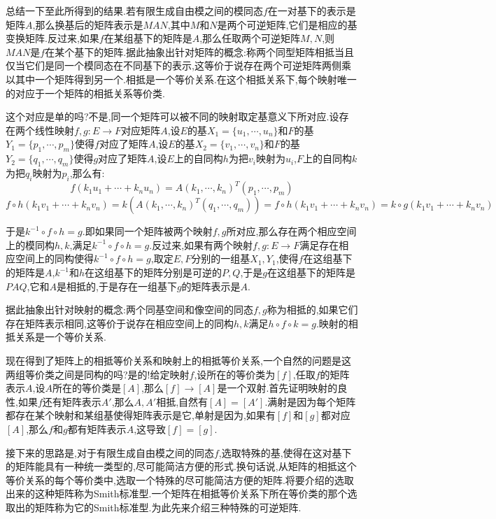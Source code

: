 总结一下至此所得到的结果.若有限生成自由模之间的模同态$f$在一对基下的表示是矩阵$A$,那么换基后的矩阵表示是$MAN$,其中$M$和$N$是两个可逆矩阵,它们是相应的基变换矩阵.反过来,如果$f$在某组基下的矩阵是$A$,那么任取两个可逆矩阵$M,N$,则$MAN$是$f$在某个基下的矩阵.据此抽象出针对矩阵的概念:称两个同型矩阵相抵当且仅当它们是同一个模同态在不同基下的表示,这等价于说存在两个可逆矩阵两侧乘以其中一个矩阵得到另一个.相抵是一个等价关系.在这个相抵关系下,每个映射唯一的对应于一个矩阵的相抵关系等价类.

这个对应是单的吗?不是,同一个矩阵可以被不同的映射取定基意义下所对应.设存在两个线性映射$f,g:E\to F$对应矩阵$A$,设$E$的基$X_1=\{u_1,\cdots,u_n\}$和$F$的基$Y_1=\{p_1,\cdots,p_m\}$使得$f$对应了矩阵$A$,设$E$的基$X_2=\{v_1,\cdots,v_n\}$和$F$的基$Y_2=\{q_1,\cdots,q_m\}$使得$g$对应了矩阵$A$,设$E$上的自同构$h$为把$v_i$映射为$u_i$,$F$上的自同构$k$为把$q_i$映射为$p_i$,那么有:
$$f(k_1u_1+\cdots+k_nu_n)=A(k_1,\cdots,k_n)^T(p_1,\cdots,p_m)$$
$$f\circ h(k_1v_1+\cdots+k_nv_n)=k\left(A(k_1,\cdots,k_n)^T(q_1,\cdots,q_m)\right)
=f\circ h(k_1v_1+\cdots+k_nv_n)=k\circ g(k_1v_1+\cdots+k_nv_n)$$

于是$k^{-1}\circ f\circ h=g$.即如果同一个矩阵被两个映射$f,g$所对应,那么存在两个相应空间上的模同构$h,k$,满足$k^{-1}\circ f\circ h=g$.反过来,如果有两个映射$f,g:E\to F$满足存在相应空间上的同构使得$k^{-1}\circ f\circ h=g$,取定$E,F$分别的一组基$X_1,Y_1$,使得$f$在这组基下的矩阵是$A$,$k^{-1}$和$h$在这组基下的矩阵分别是可逆的$P,Q$,于是$g$在这组基下的矩阵是$PAQ$,它和$A$是相抵的,于是存在一组基下$g$的矩阵表示是$A$.

据此抽象出针对映射的概念:两个同基空间和像空间的同态$f,g$称为相抵的,如果它们存在矩阵表示相同,这等价于说存在相应空间上的同构$h,k$满足$h\circ f\circ k=g$.映射的相抵关系是一个等价关系.

现在得到了矩阵上的相抵等价关系和映射上的相抵等价关系,一个自然的问题是这两组等价类之间是同构的吗?是的!给定映射$f$,设所在的等价类为$[f]$,任取$f$的矩阵表示$A$,设$A$所在的等价类是$[A]$,那么$[f]\to [A]$是一个双射.首先证明映射的良性,如果$f$还有矩阵表示$A'$,那么$A,A'$相抵,自然有$[A]=[A']$.满射是因为每个矩阵都存在某个映射和某组基使得矩阵表示是它,单射是因为,如果有$[f]$和$[g]$都对应$[A]$,那么$f$和$g$都有矩阵表示$A$,这导致$[f]=[g]$.

接下来的思路是,对于有限生成自由模之间的同态$f$,选取特殊的基,使得在这对基下的矩阵能具有一种统一类型的,尽可能简洁方便的形式.换句话说,从矩阵的相抵这个等价关系的每个等价类中,选取一个特殊的尽可能简洁方便的矩阵.将要介绍的选取出来的这种矩阵称为Smith标准型.一个矩阵在相抵等价关系下所在等价类的那个选取出的矩阵称为它的Smith标准型.为此先来介绍三种特殊的可逆矩阵.

